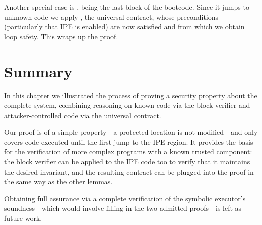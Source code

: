 Another special case is , being the last block of the bootcode. Since it jumps to unknown code we apply , \ie the universal contract, whose preconditions (particularly that IPE is enabled) are now satisfied and from which we obtain loop safety. This wraps up the proof.

\section{Summary}

In this chapter we illustrated the process of proving a security property about the complete system, combining reasoning on known code via the block verifier and attacker-controlled code via the universal contract.

Our proof is of a simple property---a protected location is not modified---and only covers code executed until the first jump to the IPE region. It provides the basis for the verification of more complex programs with a known trusted component: the block verifier can be applied to the IPE code too to verify that it maintains the desired invariant, and the resulting contract can be plugged into the proof in the same way as the other  lemmas.

Obtaining full assurance via a complete verification of the symbolic executor's soundness---which would involve filling in the two admitted proofs---is left as future work.
